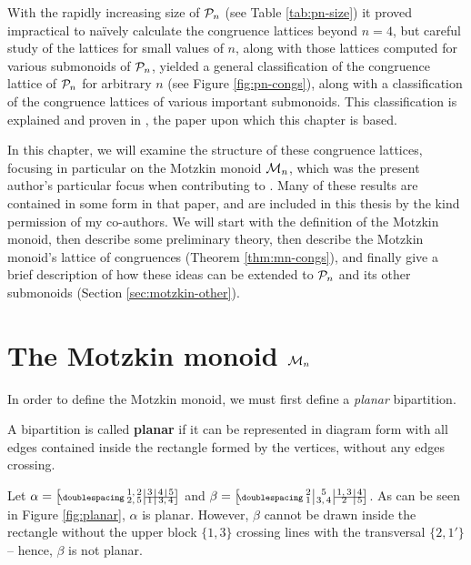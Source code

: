 With the rapidly increasing size of $\mathcal{P}_n$ (see Table \ref{tab:pn-size}) it
proved impractical to na\"ively calculate the congruence lattices beyond $n=4$,
but careful study of the lattices for small values of $n$, along with those
lattices computed for various submonoids of $\mathcal{P}_n$, yielded a general
classification of the congruence lattice of $\mathcal{P}_n$ for arbitrary $n$ (see
Figure \ref{fig:pn-congs}), along with a classification of the congruence
lattices of various important submonoids.  This classification is explained and
proven in \cite{ourpaper}, the paper upon which this chapter is based.

In this chapter, we will examine the structure of these congruence lattices,
focusing in particular on the Motzkin monoid $\mathcal{M}_n$, which was the present
author's particular focus when contributing to \cite{ourpaper}.  Many of these
results are contained in some form in that paper, and are included in this
thesis by the kind permission of my co-authors.  We will start with the
definition of the Motzkin monoid, then describe some preliminary theory, then
describe the Motzkin monoid's lattice of congruences (Theorem
\ref{thm:mn-congs}), and finally give a brief description of how these ideas can
be extended to $\mathcal{P}_n$ and its other submonoids (Section
\ref{sec:motzkin-other}).

\section{The Motzkin monoid $\mathcal{M}_n$}
\label{sec:motzkin-monoid}
In order to define the Motzkin monoid, we must first define a \textit{planar}
bipartition.

\begin{definition}
  \label{def:planar}
  A bipartition is called \textbf{planar} if it can be represented in diagram
  form with all edges contained inside the rectangle formed by the vertices,
  without any edges crossing.
\end{definition}

\begin{example}
  Let $\alpha = \bipart{c|c|c|c}{2-4}{1,2 &3 &4 &5}{2,5 &1 &\mc2{c}{3,4}}$ and
  $\beta = \bipart{c|c|c|c}{3-4}{2 &5 &1,3 &4}{1 &3,4 &2 &5}$.  As can be seen
  in Figure \ref{fig:planar}, $\alpha$ is planar.  However, $\beta$ cannot be
  drawn inside the rectangle without the upper block $\{1,3\}$ crossing lines
  with the transversal $\{2, 1'\}$ -- hence, $\beta$ is not planar.
\end{example}

